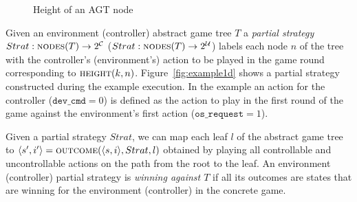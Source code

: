 \begin{figure}
    \centering
    \caption{Height of an AGT node}
    \label{fig:agtHeight}
\end{figure}

Given an environment (controller) abstract game tree $T$ a \emph{partial strategy} $Strat: \textsc{nodes}(T) \rightarrow 2^{\mathcal{C}}$ ($Strat: \textsc{nodes}(T) \rightarrow 2^{\mathcal{U}}$) labels each node $n$ of the tree with the controller's (environment's) action to be played in the game round corresponding to $\textsc{height}(k, n)$. Figure~\ref{fig:example1d} shows a partial strategy constructed during the example execution. In the example an action for the controller ($\texttt{dev\_cmd} = 0$) is defined as the action to play in the first round of the game against the environment's first action ($\texttt{os\_request} = 1$).  

Given a partial strategy $Strat$, we can map each leaf $l$ of the abstract game tree to $\langle s',i'\rangle=\textsc{outcome}(\langle s, i\rangle, Strat, l)$ obtained by playing all controllable and uncontrollable actions on the path from the root to the leaf.  An environment (controller) partial strategy is \emph{winning against $T$} if all its outcomes are states that are winning for the environment (controller) in the concrete game.

